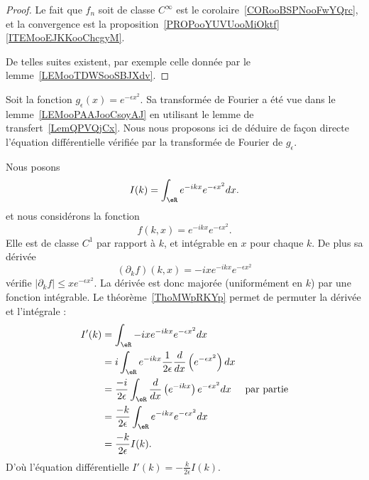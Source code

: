 \begin{proof}
	Le fait que \( f_n\) soit de classe \(  C^{\infty}\) est le corolaire~\ref{CORooBSPNooFwYQrc}, et la convergence est la proposition~\ref{PROPooYUVUooMiOktf}\ref{ITEMooEJKKooChcgyM}.

	De telles suites existent, par exemple celle donnée par le lemme~\ref{LEMooTDWSooSBJXdv}.
\end{proof}

\begin{example} \label{EXooLMXKooFcAZGR}
	Soit la fonction \( g_{\epsilon}(x)= e^{-\epsilon x^2}\). Sa transformée de Fourier a été vue dans le lemme~\ref{LEMooPAAJooCsoyAJ} en utilisant le lemme de transfert~\ref{LemQPVQjCx}. Nous nous proposons ici de déduire de façon directe l'équation différentielle vérifiée par la transformée de Fourier de \( g_{\epsilon}\).

	Nous posons
	\begin{equation}
		I(k)=\int_{\eR} e^{-ikx} e^{-\epsilon x^2}dx.
	\end{equation}
	et nous considérons la fonction
	\begin{equation}
		f(k,x)= e^{-ikx} e^{-\epsilon x^2}.
	\end{equation}
	Elle est de classe \( C^1\) par rapport à \( k\), et intégrable en \( x\) pour chaque \( k\). De plus sa dérivée
	\begin{equation}
		(\partial_k f)(k,x)=-ix e^{-ikx} e^{-\epsilon x^2}
	\end{equation}
	vérifie \( | \partial_kf |\leq x e^{-\epsilon x^2}\). La dérivée est donc majorée (uniformément en \( k\)) par une fonction intégrable. Le théorème~\ref{ThoMWpRKYp} permet de permuter la dérivée et l'intégrale :
	\begin{subequations}
		\begin{align}
			I'(k) & =\int_{\eR}-ix e^{-ikx} e^{-\epsilon x^2}dx                                                                         \\
			      & =i\int_{\eR} e^{-ikx}\frac{1}{ 2\epsilon } \frac{ d  }{ dx }\left(  e^{-\epsilon x^2} \right)dx                     \\
			      & =\frac{ -i }{ 2\epsilon }\int_{\eR}\frac{ d }{ dx }\left(  e^{-ikx} \right) e^{-\epsilon x^2}dx & \text{par partie} \\
			      & =\frac{ -k }{ 2\epsilon }\int_{\eR} e^{-ikx} e^{-\epsilon x^2}dx                                                    \\
			      & =\frac{ -k }{ 2\epsilon }I(k).
		\end{align}
	\end{subequations}
	D'où l'équation différentielle \( I'(k)=-\frac{ k }{ 2\epsilon }I(k)\).
\end{example}



